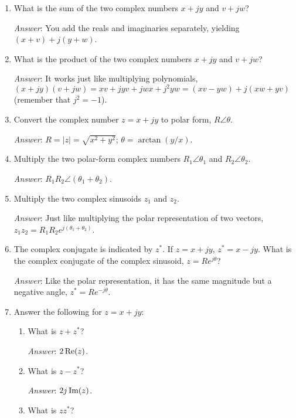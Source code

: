\begin{enumerate}
\item What is the sum of the two complex numbers $x + jy$ and $v +
  jw$?\label{it:ch1excn1}

  \textit{Answer}: You add the reals and imaginaries separately,
  yielding $(x+v) + j (y+w)$.

\item What is the product of the two complex numbers $x + jy$ and $v +
  jw$?\label{it:ch1excn2}

  \textit{Answer}: It works just like multiplying polynomials,
  $(x + jy)(v + jw) = xv + jyv + jwx + j^2yw = (xv-yw) + j(xw+yv)$
  (remember that $j^2 = -1$).

\item Convert the complex number $z = x + jy$ to polar form,
  $R\angle\theta$.\label{it:ch1excn3}

  \textit{Answer}: $R = |z| =  \sqrt{x^2+y^2}$; $\theta =
  \arctan(y/x)$.

\item Multiply the two polar-form complex numbers $R_1\angle\theta_1$ and
  $R_2\angle\theta_2$.\label{it:ch1excn4}

  \textit{Answer}: $R_1R_2\angle(\theta_1+\theta_2)$.

\item Multiply the two complex sinusoids $z_1$ and
  $z_2$.\label{it:ch1exce1}

  \textit{Answer}: Just like multiplying the polar
  representation of two vectors, $z_1z_2 =
  R_1R_2e^{j(\theta_1+\theta_2)}$.

\item The complex conjugate is indicated by $z^*$. If $z=x+jy$,
  $z^*=x-jy$.  What is the complex conjugate of the complex sinusoid,
  $z=Re^{j\theta}$?\label{it:ch1exce2}

  \textit{Answer}: Like the polar representation, it
  has the same magnitude but a negative angle, $z^* =
  Re^{-j\theta}$.

\item Answer the following for $z = x + jy$:\label{it:ch1exce3}
  \begin{enumerate}
  \item What is $z + z^*$?

    \textit{Answer}: $2\operatorname{Re}(z)$.
  \item What is $z - z^*$?

    \textit{Answer}: $2j\operatorname{Im}(z)$.

  \item What is $zz^*$?


\end{enumerate}
\end{enumerate}
